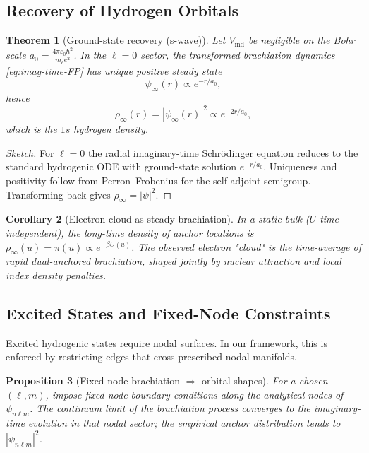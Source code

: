 \documentclass[11pt]{article}
\theoremstyle{plain}
\newtheorem{theorem}{Theorem}[section]
\newtheorem{proposition}[theorem]{Proposition}
\newtheorem{corollary}[theorem]{Corollary}
\theoremstyle{definition}
\begin{document}
\subsection{Recovery of Hydrogen Orbitals}

\begin{theorem}[Ground-state recovery (s-wave)]
  \label{thm:gs-recovery}
  Let $V_{\mathrm{ind}}$ be negligible on the Bohr scale $a_0=\frac{4\pi\varepsilon_0\hbar^2}{m_e e^2}$. In the $\ell=0$ sector, the transformed brachiation dynamics \eqref{eq:imag-time-FP} has unique positive steady state
  \[
    \psi_\infty(r)\propto e^{-r/a_0},
  \]
  hence
  \[
    \rho_\infty(r) = |\psi_\infty(r)|^2 \propto e^{-2r/a_0},
  \]
  which is the $1s$ hydrogen density.
\end{theorem}

\begin{proof}[Sketch]
  For $\ell=0$ the radial imaginary-time Schrödinger equation reduces to the standard hydrogenic ODE with ground-state solution $e^{-r/a_0}$. Uniqueness and positivity follow from Perron–Frobenius for the self-adjoint semigroup. Transforming back gives $\rho_\infty=|\psi|^2$.
\end{proof}

\begin{corollary}[Electron cloud as steady brachiation]
  In a static bulk ($U$ time-independent), the long-time density of anchor locations is $\rho_\infty(u)=\pi(u)\propto e^{-\beta U(u)}$. The observed electron "cloud" is the time-average of rapid dual-anchored brachiation, shaped jointly by nuclear attraction and local index density penalties.
\end{corollary}

\subsection{Excited States and Fixed-Node Constraints}

Excited hydrogenic states require nodal surfaces. In our framework, this is enforced by restricting edges that cross prescribed nodal manifolds.

\begin{proposition}[Fixed-node brachiation $\Rightarrow$ orbital shapes]
  \label{prop:fixed-node}
  For a chosen $(\ell,m)$, impose fixed-node boundary conditions along the analytical nodes of $\psi_{n\ell m}$. The continuum limit of the brachiation process converges to the imaginary-time evolution in that nodal sector; the empirical anchor distribution tends to $|\psi_{n\ell m}|^2$.
\end{proposition}
\end{document}
